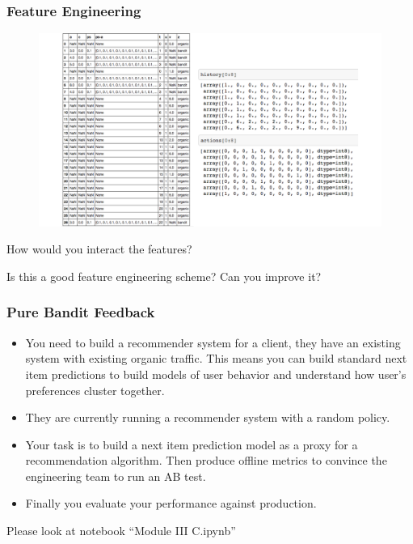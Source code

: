 \begin{frame}
  \frametitle{Feature Engineering}
\begin{figure}[h!]
\includegraphics[scale=0.3]{images/feature_engineering.png}
\centering
\end{figure}

\pause
How would you interact the features?

\pause
Is this a good feature engineering scheme?  Can you improve it?
\end{frame}




\begin{frame}
  \frametitle{Pure Bandit Feedback}

    \begin{itemize}
      \item You need to build a recommender system for a client, they have an existing system with existing organic traffic.  \pause This means you can build standard next item predictions to build models of user behavior and understand how user's preferences cluster together. \pause
      \item They are currently running a recommender system with a random policy. \pause
      \item Your task is to build a next item prediction model as a proxy for a recommendation algorithm.  Then produce offline metrics to convince the engineering team to run an AB test.\pause
      \item Finally you evaluate your performance against production.
    \end{itemize}

    \pause
    Please look at notebook ``Module III C.ipynb''

\end{frame}




